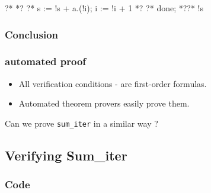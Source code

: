 \begin{frame}[fragile]
\begin{normalsize}
\begin{whycode}
  ?*
	 	*?
	 	\only<5>{\hspace*{-2em}\crond{vc2}{red}~}
	 	?*  s := !s + a.(!i);  
    i := !i + 1
 *?
 	?* done;
 *??* !s 
\end{whycode}\vspace*{-0.5em}
\end{normalsize}
\end{frame}

\subsubsection*{Conclusion}
\begin{frame}
\frametitle{automated proof}
\begin{itemize}
\item All verification conditions {\tiny {} - } are first-order formulas.
\item Automated theorem provers easily prove them. 
\end{itemize}
\bigskip\pause
\begin{center}
 {\color{red} Can we prove \texttt{sum\_iter} in a similar way ?}
\end{center}
\end{frame}

\subsection*{Verifying Sum\_iter}
\subsubsection*{Code}


